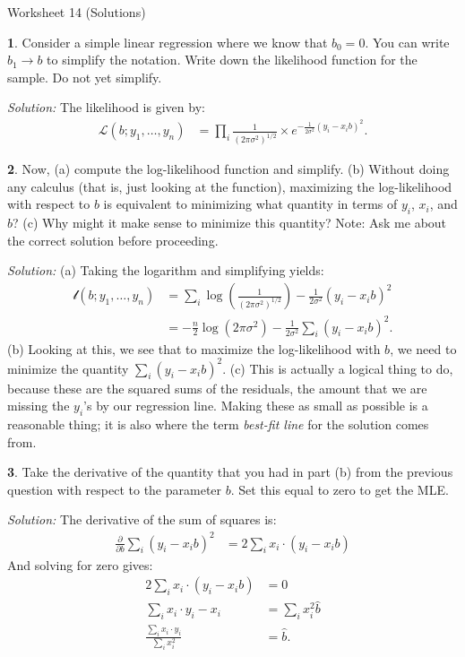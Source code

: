 \documentclass{tufte-handout}
\begin{document}
\justify

{\LARGE Worksheet 14 (Solutions)}

\vspace*{18pt}


\textbf{1}. Consider a simple linear regression where we know that $b_0 = 0$. You can write
$b_1 \rightarrow b$ to simplify the notation. Write down the likelihood function
for the sample. Do not yet simplify.

\textit{Solution:} The likelihood is given by:
\begin{align*}
\mathcal{L}(b; y_1, \ldots, y_n) &= 
\prod_i \frac{1}{(2 \pi \sigma^2)^{1/2}} \times e^{-\frac{1}{2\sigma^2}(y_i - x_i b)^2}.
\end{align*}

\textbf{2}. Now, (a) compute the log-likelihood function and simplify. (b) Without doing any
calculus (that is, just looking at the function), maximizing the log-likelihood
with respect to $b$ is equivalent to minimizing what quantity in terms of $y_i$,
$x_i$, and $b$? (c) Why might it make sense to minimize this quantity?
Note: Ask me about the correct solution before proceeding. 

\textit{Solution:} (a) Taking the logarithm and simplifying yields:
\begin{align*}
\mathcal{l}(b; y_1, \ldots, y_n) &= 
\sum_i \log\left(\frac{1}{(2 \pi \sigma^2)^{1/2}}\right) - \frac{1}{2\sigma^2}(y_i - x_i b)^2 \\
&=  -\frac{n}{2}\log(2 \pi \sigma^2) - \frac{1}{2\sigma^2} \sum_i (y_i - x_i b)^2.
\end{align*}
(b) Looking at this, we see that to maximize the log-likelihood with $b$, we need
to minimize the quantity $\sum_i (y_i - x_i b)^2$. (c) This is actually a logical
thing to do, because these are the squared sums of the residuals, the amount that
we are missing the $y_i$'s by our regression line. Making these as small as 
possible is a reasonable thing; it is also where the term \textit{best-fit line}
for the solution comes from.

\textbf{3}. Take the derivative of the quantity that you had in part (b) from the previous
question with respect to the parameter $b$. Set this equal to zero to get the 
MLE.

\textit{Solution:} The derivative of the sum of squares is:
\begin{align*}
\frac{\partial}{\partial b} \sum_i (y_i - x_i b)^2 &= 2 \sum_i x_i \cdot (y_i - x_i b)
\end{align*}
And solving for zero gives:
\begin{align*}
2 \sum_i x_i \cdot (y_i - x_i b) &= 0\\
\sum_i x_i \cdot y_i - x_i &= \sum_i x_i^2 \widehat{b} \\
\frac{\sum_i x_i \cdot y_i}{\sum_i x_i^2} &= \widehat{b}.
\end{align*}
\end{document}
